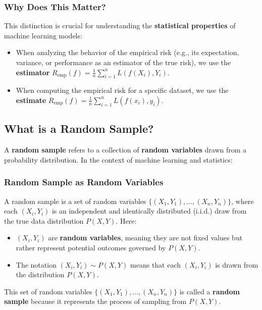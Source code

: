 \begin{notechapter}
\subsubsection{Why Does This Matter?}

This distinction is crucial for understanding the \textbf{statistical properties} of machine learning models:
\begin{itemize}
    \item When analyzing the behavior of the empirical risk (e.g., its expectation, variance, or performance as an estimator of the true risk), we use the \textbf{estimator} \( R_{\text{emp}}(f) = \frac{1}{n} \sum_{i=1}^n L(f(X_i), Y_i) \).
    \item When computing the empirical risk for a specific dataset, we use the \textbf{estimate} \( R_{\text{emp}}(f) = \frac{1}{n} \sum_{i=1}^n L(f(x_i), y_i) \).
\end{itemize}

\subsection{What is a Random Sample?}

A \textbf{random sample} refers to a collection of \textbf{random variables} drawn from a probability distribution. In the context of machine learning and statistics:

\subsubsection{Random Sample as Random Variables}

A random sample is a set of random variables \( \{(X_1, Y_1), \dots, (X_n, Y_n)\} \), where each \( (X_i, Y_i) \) is an independent and identically distributed (i.i.d.) draw from the true data distribution \( P(X, Y) \). Here:
\begin{itemize}
    \item \( (X_i, Y_i) \) are \textbf{random variables}, meaning they are not fixed values but rather represent potential outcomes governed by \( P(X, Y) \).
    \item The notation \( (X_i, Y_i) \sim P(X, Y) \) means that each \( (X_i, Y_i) \) is drawn from the distribution \( P(X, Y) \).
\end{itemize}

This set of random variables \( \{(X_1, Y_1), \dots, (X_n, Y_n)\} \) is called a \textbf{random sample} because it represents the process of sampling from \( P(X, Y) \).


\end{notechapter}
